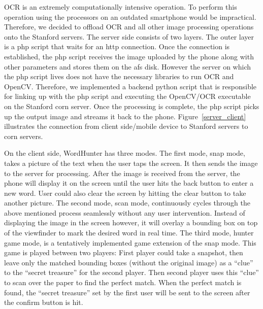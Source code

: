 \documentclass[conference]{IEEEtran}
\begin{document}
OCR is an extremely computationally intensive operation. To perform this operation using the processors on an outdated smartphone would be impractical. Therefore, we decided to offload OCR and all other image processing operations onto the Stanford servers. The server side consists of two layers. The outer layer is a php script that waits for an http connection. Once the connection is established, the php script receives the image uploaded by the phone along with other parameters and stores them on the afs disk. However the server on which the php script lives does not have the necessary libraries to run OCR and OpenCV. Therefore, we implemented a backend python script that is responsible for linking up with the php script and executing the OpenCV/OCR executable on the Stanford corn server. Once the processing is complete, the php script picks up the output image and streams it back to the phone.  Figure~\ref{server_client} illustrates the connection from client side/mobile device to Stanford servers to corn servers.

On the client side, WordHunter has three modes. The first mode, snap mode, takes a picture of the text when the user taps the screen. It then sends the image to the server for processing. After the image is received from the server, the phone will display it on the screen until the user hits the back button to enter a new word.  User could also clear the screen by hitting the clear button to take another picture.  The second mode, scan mode, continuously cycles through the above mentioned process seamlessly without any user intervention. Instead of displaying the image in the screen however, it will overlay a bounding box on top of the viewfinder to mark the desired word in real time.  The third mode, hunter game mode, is a tentatively implemented game extension of the snap mode. This game is played between two players: First player could take a snapshot, then leave only the matched bounding boxes (without the original image) as a ``clue'' to the ``secret treasure''  for the second player. Then second player uses this ``clue'' to scan over the paper to find the perfect match. When the perfect match is found, the ``secret treasure'' set by the first user will be sent to the screen after the confirm button is hit.
\end{document}
